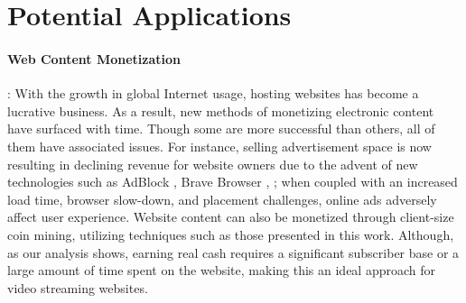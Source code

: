 \documentclass[runningheads]{llncs}
\begin{document}

\section{Potential Applications}
\label{sec:applications}
\paragraph{\textbf{Web Content Monetization}}:
With the growth in global Internet usage, hosting websites has become a lucrative business. As a result, new methods of monetizing electronic content have surfaced with time. Though some are more successful than others, all of them have associated issues. For instance, selling advertisement space is now resulting in declining revenue for website owners due to the advent of new technologies such as AdBlock \cite{Adblock}, Brave Browser \cite{BraveBrowser}, \cite{decliningRevenue}; when coupled with an increased load time, browser slow-down, and placement challenges, online ads adversely affect user experience.  Website content can also be monetized through client-size coin mining, utilizing techniques such as those presented in this work. Although, as our analysis shows, earning real cash requires a significant subscriber base or a large amount of time spent on the website, making this an ideal approach for video streaming websites.
\end{document}
